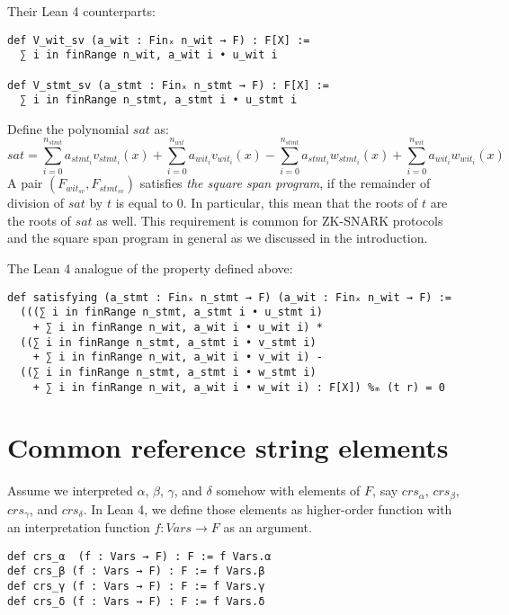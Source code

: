 \documentclass{article}
\theoremstyle{definition}
\theoremstyle{remark}
\begin{document}
Their Lean 4 counterparts:
\begin{lstlisting}
def V_wit_sv (a_wit : Finₓ n_wit → F) : F[X] :=
  ∑ i in finRange n_wit, a_wit i • u_wit i

def V_stmt_sv (a_stmt : Finₓ n_stmt → F) : F[X] :=
  ∑ i in finRange n_stmt, a_stmt i • u_stmt i
\end{lstlisting}

Define the polynomial $sat$ as:
\begin{equation}
sat = \sum \limits_{i = 0}^{n_{stmt}} a_{{stmt}_i} v_{{stmt}_i}(x) + \sum \limits_{i = 0}^{n_{wit}} a_{{wit}_i} v_{{wit}_i}(x) - \sum \limits_{i = 0}^{n_{stmt}} a_{{stmt}_i} w_{{stmt}_i}(x) + \sum \limits_{i = 0}^{n_{wit}} a_{{wit}_i} w_{{wit}_i}(x)
\end{equation}
A pair $(F_{{wit}_{sv}}, F_{{stmt}_{sv}})$ satisfies \emph{the square span program},
if the remainder of division of $sat$ by $t$ is equal to $0$.
In particular, this mean that the roots of $t$ are the roots of $sat$ as well.
This requirement is common for ZK-SNARK protocols and the square span program in general as we discussed in the introduction.

The Lean 4 analogue of the property defined above:
\begin{lstlisting}
def satisfying (a_stmt : Finₓ n_stmt → F) (a_wit : Finₓ n_wit → F) :=
  (((∑ i in finRange n_stmt, a_stmt i • u_stmt i)
    + ∑ i in finRange n_wit, a_wit i • u_wit i) *
  ((∑ i in finRange n_stmt, a_stmt i • v_stmt i)
    + ∑ i in finRange n_wit, a_wit i • v_wit i) -
  ((∑ i in finRange n_stmt, a_stmt i • w_stmt i)
    + ∑ i in finRange n_wit, a_wit i • w_wit i) : F[X]) %ₘ (t r) = 0
\end{lstlisting}

\section{Common reference string elements}

Assume we interpreted $\alpha$, $\beta$, $\gamma$, and $\delta$ somehow with elements of $F$,
say $crs_{\alpha}$, $crs_{\beta}$, $crs_{\gamma}$, and $crs_{\delta}$.
In Lean 4, we define those elements as higher-order function with an interpretation function
$f : Vars \to F$ as an argument.

\begin{lstlisting}
def crs_α  (f : Vars → F) : F := f Vars.α
def crs_β (f : Vars → F) : F := f Vars.β
def crs_γ (f : Vars → F) : F := f Vars.γ
def crs_δ (f : Vars → F) : F := f Vars.δ
\end{lstlisting}
\end{document}
